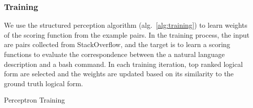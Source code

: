 
\subsubsection{Training}
\label{subsec:training}

We use the structured perception algorithm (alg.~\ref{alg:training}) to learn weights of the scoring function from the example pairs. In the training process, the input are pairs collected from StackOverflow, and the target is to learn a scoring functions to evaluate the correspondence between the a natural language description and a bash command. In each training iteration, top ranked logical form are selected and the weights are updated based on its similarity to the ground truth logical form.

\begin{algorithm}
\caption{Perceptron Training\label{alg:training}}
\end{algorithm}
